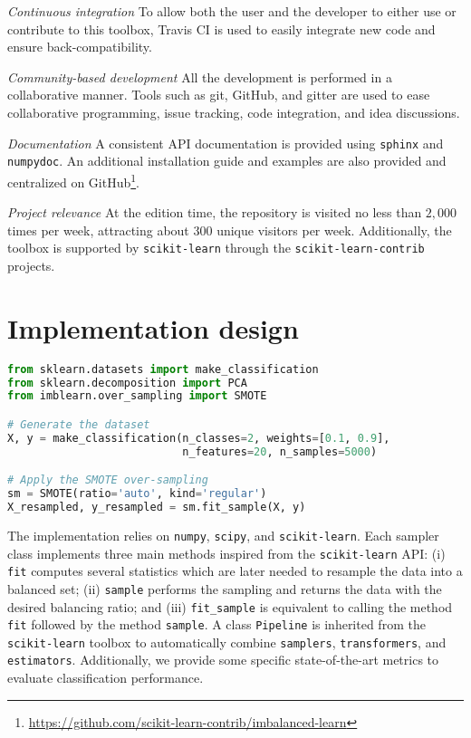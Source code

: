 \documentclass[twoside,11pt]{article}
\begin{document}
\noindent\textit{Continuous integration} To allow both the user and the developer to either use or contribute to this toolbox, Travis CI is used to easily integrate new code and ensure back-compatibility.

\noindent\textit{Community-based development} All the development is performed in a collaborative manner.
Tools such as git, GitHub, and gitter are used to ease collaborative programming, issue tracking, code integration, and idea discussions.

\noindent\textit{Documentation} A consistent API documentation is provided using \texttt{sphinx} and \texttt{numpydoc}.
An additional installation guide and examples are also provided and centralized on GitHub\footnote{\url{https://github.com/scikit-learn-contrib/imbalanced-learn}}.

\noindent\textit{Project relevance} At the edition time, the repository is visited no less than $2,000$ times per week, attracting about $300$ unique visitors per week.
Additionally, the toolbox is supported by \texttt{scikit-learn} through the \texttt{scikit-learn-contrib} projects.

\section{Implementation design}

\begin{lstlisting}[language=Python, caption=Code snippet to over-sample a dataset using SMOTE.]
from sklearn.datasets import make_classification
from sklearn.decomposition import PCA
from imblearn.over_sampling import SMOTE

# Generate the dataset
X, y = make_classification(n_classes=2, weights=[0.1, 0.9],
                           n_features=20, n_samples=5000)

# Apply the SMOTE over-sampling
sm = SMOTE(ratio='auto', kind='regular')
X_resampled, y_resampled = sm.fit_sample(X, y)
\end{lstlisting}

The implementation relies on \texttt{numpy}, \texttt{scipy}, and \texttt{scikit-learn}.
Each sampler class implements three main methods inspired from the \texttt{scikit-learn} API:
(i) \texttt{fit} computes several statistics which are later needed to resample the data into a balanced set;
(ii) \texttt{sample} performs the sampling and returns the data with the desired balancing ratio;
and (iii) \texttt{fit\_sample} is equivalent to calling the method \texttt{fit} followed by the method \texttt{sample}.
A class \texttt{Pipeline} is inherited from the \texttt{scikit-learn}
toolbox to automatically combine \texttt{samplers},
\texttt{transformers}, and \texttt{estimators}.
Additionally, we provide some specific state-of-the-art metrics to evaluate
classification performance.
\bigbreak
\end{document}
